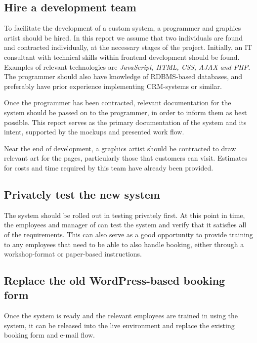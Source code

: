 \subsection{Hire a development team}
To facilitate the development of a custom system, a programmer and graphics
artist should be hired. In this report we assume that two individuals are found
and contracted individually, at the necessary stages of the project. Initially,
an IT consultant with technical skills within frontend development should be
found. Examples of relevant technologies are \textit{JavaScript, HTML, CSS, AJAX
and PHP}. The programmer should also have knowledge of RDBMS-based databases,
and preferably have prior experience implementing CRM-systems or similar.

Once the programmer has been contracted, relevant documentation for the system
should be passed on to the programmer, in order to inform them as best possible.
This report serves as the primary documentation of the system and its intent,
supported by the mockups and presented work flow.

Near the end of development, a graphics artist should be contracted to draw
relevant art for the pages, particularly those that customers can visit.
Estimates for costs and time required by this team have already been provided.

\subsection{Privately test the new system}
The system should be rolled out in testing privately first. At this point in
time, the employees and manager of \gomonkey{} can test the system and verify
that it satisfies all of the requirements. This can also serve as a good
opportunity to provide training to any employees that need to be able to also
handle booking, either through a workshop-format or paper-based instructions.

\subsection{Replace the old WordPress-based booking form}
Once the system is ready and the relevant employees are trained in using the
system, it can be released into the live environment and replace the existing
booking form and e-mail flow.

\newpage
